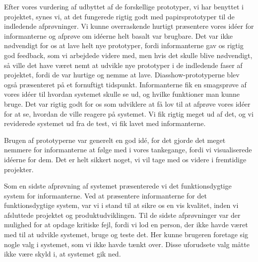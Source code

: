 Efter vores vurdering af udbyttet af de forskellige prototyper, vi har benyttet i projektet, synes vi, at det fungerede rigtig godt med papirsprototyper til de indledende afprøvninger. Vi kunne overraskende hurtigt præsentere vores idéer for informanterne og afprøve om idéerne helt basalt var brugbare. Det var ikke nødvendigt for os at lave helt nye prototyper, fordi informanterne gav os rigtig god feedback, som vi arbejdede videre med, men hvis det skulle blive nødvendigt, så ville det have været nemt at udvikle nye prototyper i de indledende faser af projektet, fordi de var hurtige og nemme at lave. Diasshow-prototyperne blev også præsenteret på et fornuftigt tidspunkt. Informanterne fik en smagsprøve af vores idéer til hvordan systemet skulle se ud, og hvilke funktioner man kunne bruge. Det var rigtig godt for os som udviklere at få lov til at afprøve vores idéer for at se, hvordan de ville reagere på systemet. Vi fik rigtig meget ud af det, og vi reviderede systemet ud fra de test, vi fik lavet med informanterne.

Brugen af prototyperne var generelt en god idé, for det gjorde det meget nemmere for informanterne at følge med i vores tankegange, fordi vi visualiserede idéerne for dem. Det er helt sikkert noget, vi vil tage med os videre i fremtidige projekter.

Som en sidste afprøvning af systemet præsenterede vi det funktionsdygtige system for informanterne. Ved at præsentere informanterne for det funktionsdygtige system, var vi i stand til at sikre os en vis kvalitet, inden vi afsluttede projektet og produktudviklingen. Til de sidste afprøvninger var der mulighed for at opdage kritiske fejl, fordi vi lod en person, der ikke havde været med til at udvikle systemet, bruge og teste det. Her kunne brugeren foretage sig nogle valg i systemet, som vi ikke havde tænkt over. Disse uforudsete valg måtte ikke være skyld i, at systemet gik ned. 

